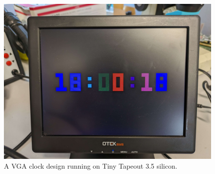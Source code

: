 \begin{figure}[!t]
\centering
\includegraphics[width=\columnwidth]{./Figs/tt3p5 vga clock.jpg}
\caption{A VGA clock design running on Tiny Tapeout 3.5 silicon.}
\label{fig:VGA_clock_design_TT03_5_silicon}
\end{figure}
